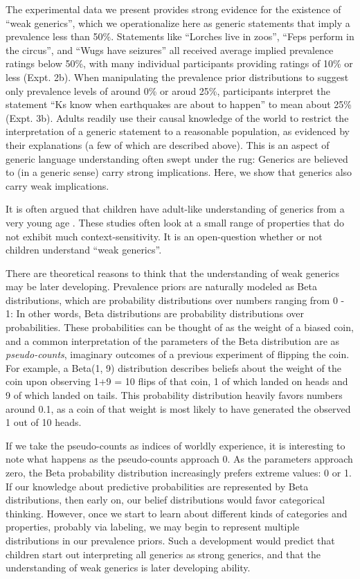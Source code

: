 \documentclass[floatsintext,man]{apa6}
\theoremstyle{definition}
\theoremstyle{definition}
\theoremstyle{definition}
\theoremstyle{remark}
\begin{document}
The experimental data we present provides strong evidence for the
existence of \enquote{weak generics}, which we operationalize here as
generic statements that imply a prevalence less than 50\%. Statements
like \enquote{Lorches live in zoos}, \enquote{Feps perform in the
circus}, and \enquote{Wugs have seizures} all received average implied
prevalence ratings below 50\%, with many individual participants
providing ratings of 10\% or less (Expt. 2b). When manipulating the
prevalence prior distributions to suggest only prevalence levels of
around 0\% or aroud 25\%, participants interpret the statement
\enquote{Ks know when earthquakes are about to happen} to mean about
25\% (Expt. 3b). Adults readily use their causal knowledge of the world
to restrict the interpretation of a generic statement to a reasonable
population, as evidenced by their explanations (a few of which are
described above). This is an aspect of generic language understanding
often swept under the rug: Generics are believed to (in a generic sense)
carry strong implications. Here, we show that generics also carry weak
implications.

It is often argued that children have adult-like understanding of
generics from a very young age
. These studies often look
at a small range of properties that do not exhibit much
context-sensitivity. It is an open-question whether or not children
understand \enquote{weak generics}.

There are theoretical reasons to think that the understanding of weak
generics may be later developing. Prevalence priors are naturally
modeled as Beta distributions, which are probability distributions over
numbers ranging from 0 - 1: In other words, Beta distributions are
probability distributions over probabilities. These probabilities can be
thought of as the weight of a biased coin, and a common interpretation
of the parameters of the Beta distribution are as \emph{pseudo-counts},
imaginary outcomes of a previous experiment of flipping the coin. For
example, a Beta(1, 9) distribution describes beliefs about the weight of
the coin upon observing 1+9 = 10 flips of that coin, 1 of which landed
on heads and 9 of which landed on tails. This probability distribution
heavily favors numbers around 0.1, as a coin of that weight is most
likely to have generated the observed 1 out of 10 heads.

If we take the pseudo-counts as indices of worldly experience, it is
interesting to note what happens as the pseudo-counts approach 0. As the
parameters approach zero, the Beta probability distribution increasingly
prefers extreme values: 0 or 1. If our knowledge about predictive
probabilities are represented by Beta distributions, then early on, our
belief distributions would favor categorical thinking. However, once we
start to learn about different kinds of categories and properties,
probably via labeling, we may begin to represent multiple distributions
in our prevalence priors. Such a development would predict that children
start out interpreting all generics as strong generics, and that the
understanding of weak generics is later developing ability.
\end{document}
